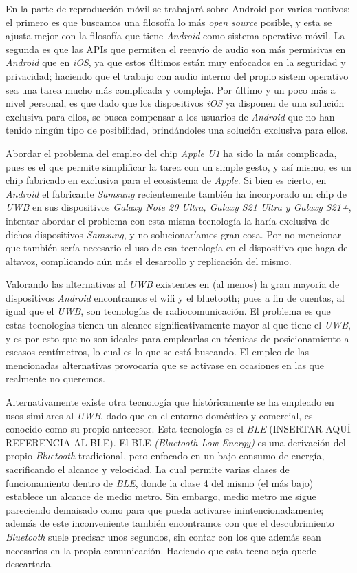 En la parte de reproducción móvil se trabajará sobre Android por varios motivos;
el primero es que buscamos una filosofía lo más \emph{open source} posible, y
esta se ajusta mejor con la filosofía que tiene \emph{Android} como sistema
operativo móvil. La segunda es que las APIs que permiten el reenvío de audio son
más permisivas en \emph{Android} que en \emph{iOS}, ya que estos últimos están
muy enfocados en la seguridad y privacidad; haciendo que el trabajo con audio
interno del propio sistem operativo sea una tarea mucho más complicada y
compleja. Por último y un poco más a nivel personal, es que dado que los
dispositivos \emph{iOS} ya disponen de una solución exclusiva para ellos, se
busca compensar a los usuarios de \emph{Android} que no han tenido ningún tipo
de posibilidad, brindándoles una solución exclusiva para ellos.

Abordar el problema del empleo del chip \emph{Apple U1} ha sido la más
complicada, pues es el que permite simplificar la tarea con un simple gesto, y
así mismo, es un chip fabricado en exclusiva para el ecosistema de \emph{Apple}.
Si bien es cierto, en \emph{Android} el fabricante \emph{Samsung} recientemente
también ha incorporado un chip de \emph{UWB} en sus dispositivos \emph{Galaxy
Note 20 Ultra, Galaxy S21 Ultra y Galaxy S21+}, intentar abordar el problema con
esta misma tecnología la haría exclusiva de dichos dispositivos \emph{Samsung},
y no solucionaríamos gran cosa. Por no mencionar que también sería necesario el
uso de esa tecnología en el dispositivo que haga de altavoz, complicando aún más
el desarrollo y replicación del mismo.

Valorando las alternativas al \emph{UWB} existentes en (al menos) la gran
mayoría de dispositivos \emph{Android} encontramos el wifi y el bluetooth; pues
a fin de cuentas, al igual que el \emph{UWB}, son tecnologías de
radiocomunicación. El problema es que estas tecnologías tienen un alcance
significativamente mayor al que tiene el \emph{UWB}, y es por esto que no son
ideales para emplearlas en técnicas de posicionamiento a escasos centímetros, lo
cual es lo que se está buscando. El empleo de las mencionadas alternativas
provocaría que se activase en ocasiones en las que realmente no queremos.

Alternativamente existe otra tecnología que históricamente se ha empleado en
usos similares al \emph{UWB}, dado que en el entorno doméstico y comercial, es
conocido como su propio antecesor. Esta tecnología es el \emph{BLE} (INSERTAR
AQUÍ REFERENCIA AL BLE). El BLE \emph{(Bluetooth Low Energy)} es una derivación
del propio \emph{Bluetooth} tradicional, pero enfocado en un bajo consumo de
energía, sacrificando el alcance y velocidad. La cual permite varias clases de
funcionamiento dentro de \emph{BLE}, donde la clase 4 del mismo (el más bajo)
establece un alcance de medio metro. Sin embargo, medio metro me sigue
pareciendo demaisado como para que pueda activarse inintencionadamente; además
de este inconveniente también encontramos con que el descubrimiento
\emph{Bluetooth} suele precisar unos segundos, sin contar con los que
además sean necesarios en la propia comunicación. Haciendo que esta tecnología
quede descartada.

